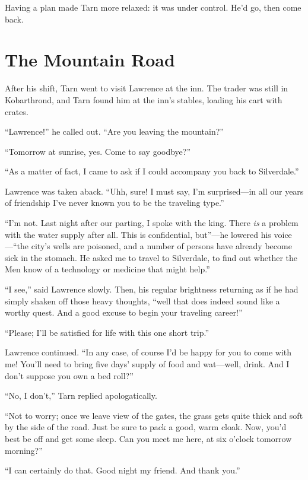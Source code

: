 Having a plan made Tarn more relaxed: it was under control.  He'd go, then come back.

\chapter{The Mountain Road}

After his shift, Tarn went to visit Lawrence at the inn.  The trader was still in Kobarthrond, and Tarn found him at the inn's stables, loading his cart with crates.

``Lawrence!'' he called out.  ``Are you leaving the mountain?''

``Tomorrow at sunrise, yes.  Come to say goodbye?''

``As a matter of fact, I came to ask if I could accompany you back to Silverdale.''

Lawrence was taken aback.  ``Uhh, sure!  I must say, I'm surprised---in all our years of friendship I've never known you to be the traveling type.''

``I'm not.  Last night after our parting, I spoke with the king.  There \emph{is} a problem with the water supply after all.  This is confidential, but''---he lowered his voice---``the city's wells are poisoned, and a number of persons have already become sick in the stomach.  He asked me to travel to Silverdale, to find out whether the Men know of a technology or medicine that might help.''

``I see,'' said Lawrence slowly.  Then, his regular brightness returning as if he had simply shaken off those heavy thoughts, ``well that does indeed sound like a worthy quest.  And a good excuse to begin your traveling career!''

``Please; I'll be satisfied for life with this one short trip.''

Lawrence continued.  ``In any case, of course I'd be happy for you to come with me!  You'll need to bring five days' supply of food and wat---well, drink.  And I don't suppose you own a bed roll?''

``No, I don't,'' Tarn replied apologatically.

``Not to worry; once we leave view of the gates, the grass gets quite thick and soft by the side of the road.  Just be sure to pack a good, warm cloak.  Now, you'd best be off and get some sleep.  Can you meet me here, at six o'clock tomorrow morning?''

``I can certainly do that.  Good night my friend.  And thank you.''

